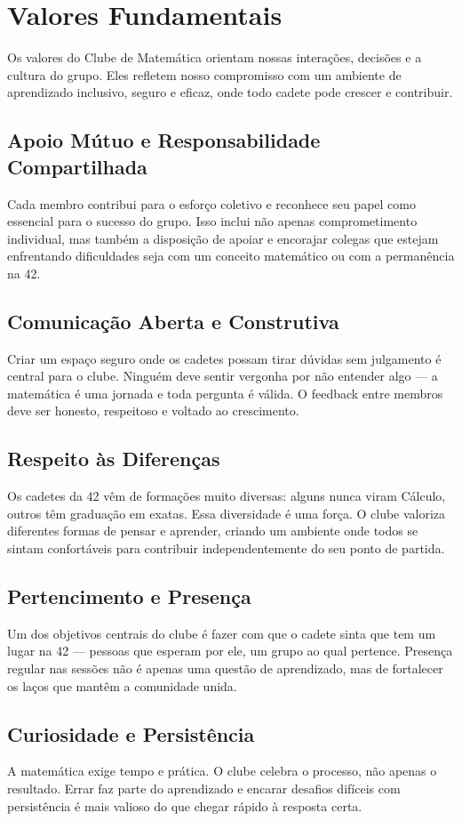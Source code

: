 \section{Valores Fundamentais}

Os valores do Clube de Matemática orientam nossas interações, decisões e a cultura do grupo.
Eles refletem nosso compromisso com um ambiente de aprendizado inclusivo, seguro e eficaz,
onde todo cadete pode crescer e contribuir.

\subsection{Apoio Mútuo e Responsabilidade Compartilhada}

Cada membro contribui para o esforço coletivo e reconhece seu papel como essencial para o
sucesso do grupo. Isso inclui não apenas comprometimento individual, mas também a disposição
de apoiar e encorajar colegas que estejam enfrentando dificuldades seja com um conceito
matemático ou com a permanência na 42.

\subsection{Comunicação Aberta e Construtiva}

Criar um espaço seguro onde os cadetes possam tirar dúvidas sem julgamento é central para
o clube. Ninguém deve sentir vergonha por não entender algo --- a matemática é uma jornada
e toda pergunta é válida. O feedback entre membros deve ser honesto, respeitoso e voltado
ao crescimento.

\subsection{Respeito às Diferenças}

Os cadetes da 42 vêm de formações muito diversas: alguns nunca viram Cálculo, outros têm
graduação em exatas. Essa diversidade é uma força. O clube valoriza diferentes formas de
pensar e aprender, criando um ambiente onde todos se sintam confortáveis para contribuir
independentemente do seu ponto de partida.

\subsection{Pertencimento e Presença}

Um dos objetivos centrais do clube é fazer com que o cadete sinta que tem um lugar na
42 --- pessoas que esperam por ele, um grupo ao qual pertence. Presença regular nas sessões
não é apenas uma questão de aprendizado, mas de fortalecer os laços que mantêm a
comunidade unida.

\subsection{Curiosidade e Persistência}

A matemática exige tempo e prática. O clube celebra o processo, não apenas o resultado.
Errar faz parte do aprendizado e encarar desafios difíceis com persistência é mais valioso
do que chegar rápido à resposta certa.
